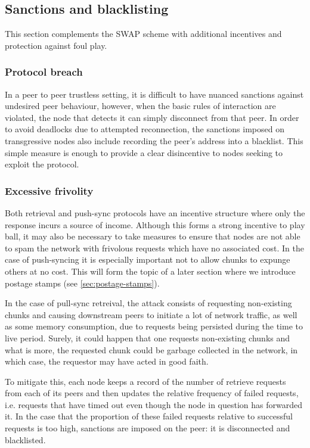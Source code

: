 \subsection{Sanctions and blacklisting \statusgreen}\label{sec:sanctions}
\red{}

This section complements the SWAP scheme with additional incentives and protection against foul play. 

\subsubsection{Protocol breach}

In a peer to peer trustless setting, it is difficult to have nuanced sanctions against undesired peer behaviour, however, when the basic rules of interaction are violated, the node that detects it can simply disconnect from that peer. In order to avoid deadlocks due to attempted reconnection, the sanctions imposed on transgressive nodes also include recording the peer's address into a blacklist. This simple measure is enough to provide a clear disincentive to nodes seeking to exploit the protocol. 

\subsubsection{Excessive frivolity}

Both retrieval and push-sync protocols have an incentive structure where only the response incurs a source of income. Although this forms a strong incentive to play ball, it may also be necessary to take measures to ensure that nodes are not able to spam the network with frivolous requests which have no associated cost. In the case of push-syncing it is especially important not to allow chunks to expunge others at no cost. This will form the topic of a later section where we introduce postage stamps (see \ref{sec:postage-stamps}).

In the case of pull-sync retreival, the attack consists of requesting non-existing chunks and causing downstream peers to initiate a lot of network traffic, as well as some memory consumption, due to requests being persisted during the time to live period.
Surely, it could happen that one requests non-existing chunks and what is more, the requested chunk could be garbage collected in the network, in which case, the requestor may have acted in good faith. 

To mitigate this, each node keeps a record of the number of retrieve requests from each of its peers and then updates the relative frequency of failed requests, i.e. requests that have timed out even though the node in question has forwarded it. In the case that the proportion of these failed requests relative to successful requests is too high, sanctions are imposed on the peer: it is disconnected and blacklisted.

